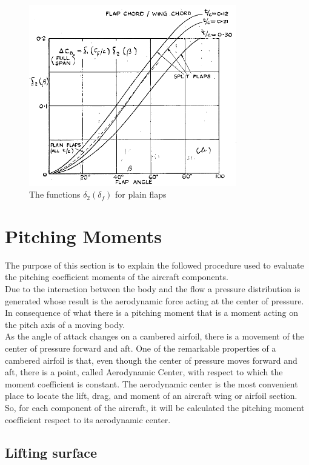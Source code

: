 \begin{figure}[H]
\centering
\includegraphics[height=7.9cm]{Immagini/Delta2_Plain}
\caption{The functions $\delta_2\left(\delta_f\right)$ for plain flaps}
\label{fig:Delta2Plain}
\end{figure}
%


\section{Pitching Moments}
The purpose of this section is to explain the followed procedure used to evaluate the pitching coefficient moments of the aircraft components.\\
Due to the interaction between the body and the flow a pressure distribution is generated whose result is the aerodynamic force acting at the center of pressure. In consequence of what there is a pitching moment that is a moment acting on the pitch axis of a moving body. \\
As the angle of attack changes on a cambered airfoil, there is a movement of the center of pressure forward and aft.  One of the remarkable properties of a cambered airfoil is that, even though the center of pressure moves forward and aft, there is a point, called Aerodynamic Center, with respect to which the moment coefficient is constant. The aerodynamic center is the most convenient place to locate the lift, drag, and moment of an aircraft wing or airfoil section.\\
So, for each component of the aircraft, it will be calculated the pitching moment coefficient respect to its aerodynamic center.



\subsection{Lifting surface}

